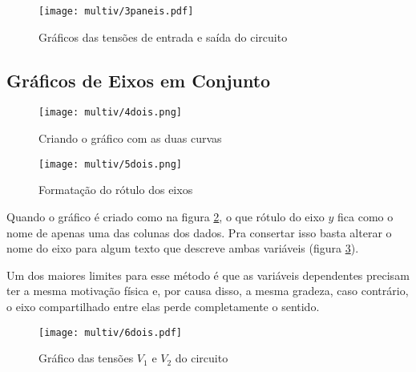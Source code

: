     \begin{figure}[H]
        \centering
        \texttt{[image: multiv/3paneis.pdf]}

        \caption{Gráficos das tensões de entrada e saída do circuito}
        \label{fig:multiv:paneis}
    \end{figure}


\subsection{Gráficos de Eixos em Conjunto}

    \begin{figure}[htbp]
        \centering
        \texttt{[image: multiv/4dois.png]}

        \caption{Criando o gráfico com as duas curvas}
        \label{fig:multiv:juntos:tutorial}
    \end{figure}

    \noindent
    \begin{minipage}[t]{0.35\textwidth}
        \begin{figure}[H]
            \centering
            \texttt{[image: multiv/5dois.png]}

            \caption{Formatação do rótulo dos eixos}
            \label{fig:multiv:juntos:formatacao}
        \end{figure}
    \end{minipage}\hspace{0.05\textwidth}%
    \begin{minipage}[t]{0.6\textwidth}\setlength{\parindent}{\indentacao}

        Quando o gráfico é criado como na figura \ref{fig:multiv:juntos:tutorial}, o que rótulo do eixo $y$ fica como o nome de apenas uma das colunas dos dados. Pra consertar isso basta alterar o nome do eixo para algum texto que descreve ambas variáveis (figura \ref{fig:multiv:juntos:formatacao}).

        Um dos maiores limites para esse método é que as variáveis dependentes precisam ter a mesma motivação física e, por causa disso, a mesma gradeza, caso contrário, o eixo compartilhado entre elas perde completamente o sentido.

    \end{minipage}

    \begin{figure}[htbp]
        \centering
        \texttt{[image: multiv/6dois.pdf]}

        \caption{Gráfico das tensões $V_1$ e $V_2$ do circuito}
        \label{fig:multiv:juntos}
    \end{figure}


